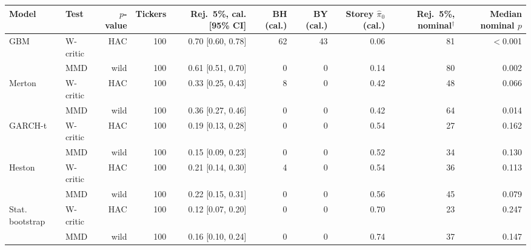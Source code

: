 \begin{tabular}{llrrrrrrrr}
\toprule
Model & Test & $p$-value & Tickers & Rej.\ 5\%, cal. [95\% CI] & BH (cal.) & BY (cal.) & Storey $\hat\pi_0$ (cal.) & Rej.\ 5\%, nominal$^{\dagger}$ & Median nominal $p$ \\
\midrule
GBM & W-critic & HAC & 100 & 0.70 [0.60, 0.78] & 62 & 43 & 0.06 & 81 & $<$0.001 \\
 & MMD & wild & 100 & 0.61 [0.51, 0.70] & 0 & 0 & 0.14 & 80 & 0.002 \\
Merton & W-critic & HAC & 100 & 0.33 [0.25, 0.43] & 8 & 0 & 0.42 & 48 & 0.066 \\
 & MMD & wild & 100 & 0.36 [0.27, 0.46] & 0 & 0 & 0.42 & 64 & 0.014 \\
GARCH-t & W-critic & HAC & 100 & 0.19 [0.13, 0.28] & 0 & 0 & 0.54 & 27 & 0.162 \\
 & MMD & wild & 100 & 0.15 [0.09, 0.23] & 0 & 0 & 0.52 & 34 & 0.130 \\
Heston & W-critic & HAC & 100 & 0.21 [0.14, 0.30] & 4 & 0 & 0.54 & 36 & 0.113 \\
 & MMD & wild & 100 & 0.22 [0.15, 0.31] & 0 & 0 & 0.56 & 45 & 0.079 \\
Stat. bootstrap & W-critic & HAC & 100 & 0.12 [0.07, 0.20] & 0 & 0 & 0.70 & 23 & 0.247 \\
 & MMD & wild & 100 & 0.16 [0.10, 0.24] & 0 & 0 & 0.74 & 37 & 0.147 \\
\bottomrule
\end{tabular}
